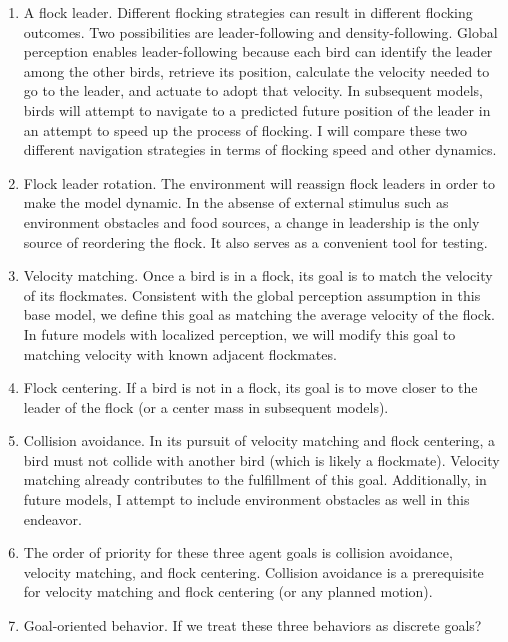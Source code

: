 \documentclass{article}
\begin{document}
\begin{enumerate}
    \item A flock leader. Different flocking strategies can result in different
      flocking outcomes. Two possibilities are leader-following and
      density-following. Global perception enables leader-following because
      each bird can identify the leader among the other birds, retrieve its
      position, calculate the velocity needed to go to the leader, and actuate
      to adopt that velocity. In subsequent models, birds will attempt to
      navigate to a predicted future position of the leader in an attempt to
      speed up the process of flocking. I will compare these two different
      navigation strategies in terms of flocking speed and other dynamics.

    \item Flock leader rotation. The environment will reassign flock leaders
      in order to make the model dynamic. In the absense of external
      stimulus such as environment obstacles and food sources, a change
      in leadership is the only source of reordering the flock. It
      also serves as a convenient tool for testing.


    \item Velocity matching. Once a bird is in a flock, its goal is to match
      the velocity of its flockmates. Consistent with the global perception
      assumption in this base model, we define this goal as matching the
      average velocity of the flock. In future models with localized
      perception, we will modify this goal to matching velocity with
      known adjacent flockmates.

    \item Flock centering. If a bird is not in a flock, its goal is to
      move closer to the leader of the flock (or a center mass in subsequent
      models).

    \item Collision avoidance. In its pursuit of velocity matching and flock
      centering, a bird must not collide with another bird (which is likely
      a flockmate). Velocity matching already contributes to the fulfillment
      of this goal. Additionally, in future models, I attempt to include
      environment obstacles as well in this endeavor.

    \item The order of priority for these three agent goals is collision
      avoidance, velocity matching, and flock centering. Collision avoidance
      is a prerequisite for velocity matching and flock centering (or any
      planned motion).

    \item Goal-oriented behavior. If we treat these three behaviors as
      discrete goals?

  \end{enumerate}
\end{document}
